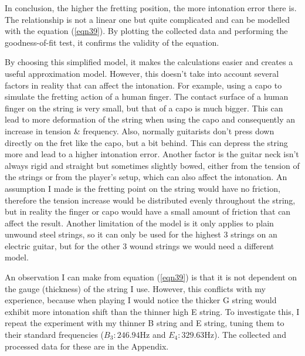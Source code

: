 In conclusion, the higher the fretting position, the more intonation error there is. The relationship is not a linear one but quite complicated and can be modelled with the equation (\ref{eqn39}). By plotting the collected data and performing the goodness-of-fit test, it confirms the validity of the equation. \par
By choosing this simplified model, it makes the calculations easier and creates a useful approximation model. However, this doesn't take into account several factors in reality that can affect the intonation. For example, using a capo to simulate the fretting action of a human finger. The contact surface of a human finger on the string is very small, but that of a capo is much bigger. This can lead to more deformation of the string when using the capo and consequently an increase in tension \& frequency. Also, normally guitarists don't press down directly on the fret like the capo, but a bit behind. This can depress the string more and lead to a higher intonation error. Another factor is the guitar neck isn't always rigid and straight but sometimes slightly bowed, either from the tension of the strings or from the player's setup, which can also affect the intonation. An assumption I made is the fretting point on the string would have no friction, therefore the tension increase would be distributed evenly throughout the string, but in reality the finger or capo would have a small amount of friction that can affect the result. Another limitation of the model is it only applies to plain unwound steel strings, so it can only be used for the highest 3 strings on an electric guitar, but for the other 3 wound strings we would need a different model.\par

An observation I can make from equation (\ref{eqn39}) is that it is not dependent on the gauge (thickness) of the string I use. However, this conflicts with my experience, because when playing I would notice the thicker G string would exhibit more intonation shift than the thinner high E string. To investigate this, I repeat the experiment with my thinner B string and E string, tuning them to their standard frequencies ($B_3: 246.94$Hz and $E_4: 329.63$Hz). The collected and processed data for these are in the Appendix.


